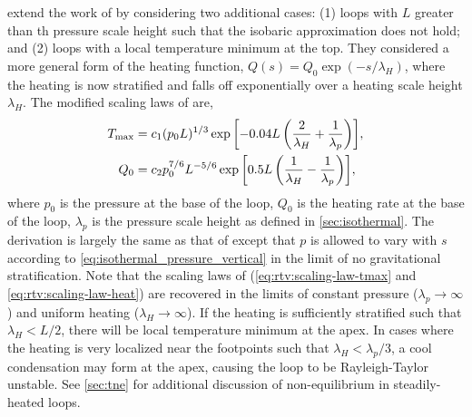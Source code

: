 \citet{serio_dynamics_1991} extend the work of \citet{rosner_dynamics_1978} by considering two additional cases: (1) loops with $L$ greater than th pressure scale height such that the isobaric approximation does not hold; and (2) loops with a local temperature minimum at the top. They considered a more general form of the heating function, $Q(s)=Q_0\exp{(-s/\lambda_H)}$, where the heating is now stratified and falls off exponentially over a heating scale height $\lambda_H$. The modified scaling laws of \citet{serio_dynamics_1991} are,
\begin{align}
    T_\textup{max} &= c_1(p_0L)^{1/3}\exp{\left[-0.04L\left(\frac{2}{\lambda_H} + \frac{1}{\lambda_p}\right)\right]}, \label{eq:serio:scaling-law-tmax} \\
    Q_0 &= c_2p_0^{7/6}L^{-5/6}\exp{\left[0.5L\left(\frac{1}{\lambda_H} - \frac{1}{\lambda_p}\right)\right]}, \label{eq:serio:scaling-law-heat}
\end{align}
where $p_0$ is the pressure at the base of the loop, $Q_0$ is the heating rate at the base of the loop, $\lambda_p$ is the pressure scale height as defined in \autoref{sec:isothermal}. The derivation is largely the same as that of \citet{rosner_dynamics_1978} except that $p$ is allowed to vary with $s$ according to \autoref{eq:isothermal_pressure_vertical} in the limit of no gravitational stratification. Note that the scaling laws of \citet{rosner_dynamics_1978} (\autoref{eq:rtv:scaling-law-tmax} and \autoref{eq:rtv:scaling-law-heat}) are recovered in the limits of constant pressure ($\lambda_p\to\infty$) and uniform heating ($\lambda_H\to\infty$). If the heating is sufficiently stratified such that $\lambda_H<L/2$, there will be local temperature minimum at the apex. In cases where the heating is very localized near the footpoints such that $\lambda_H<\lambda_p/3$, a cool condensation may form at the apex, causing the loop to be Rayleigh-Taylor unstable. See \autoref{sec:tne} for additional discussion of non-equilibrium in steadily-heated loops.

